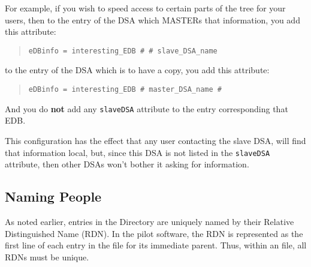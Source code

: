 For example,
if you wish to speed access to certain parts of the tree for your users,
then to the entry of the DSA which MASTERs that information,
you add this attribute: 
\begin{quote}\small\begin{verbatim}
eDBinfo = interesting_EDB # # slave_DSA_name
\end{verbatim}\end{quote}
to the entry of the DSA which is to have a copy,
you add this attribute:
\begin{quote}\small\begin{verbatim}
eDBinfo = interesting_EDB # master_DSA_name #
\end{verbatim}\end{quote}
And you do {\bf not\/} add any \verb"slaveDSA" attribute to the entry
corresponding that EDB.

This configuration has the effect that any user contacting the slave DSA,
will find that information local,
but, since this DSA is not listed in the \verb"slaveDSA" attribute,
then other DSAs won't bother it asking for information.

\subsection	{Naming People}\label{naming:people}
As noted earlier,
entries in the Directory are uniquely named by their
Relative Distinguished Name (RDN).
In the pilot software,
the RDN is represented as the first line of each entry in the  file
for its immediate parent.
Thus,
within an  file,
all RDNs must be unique.

